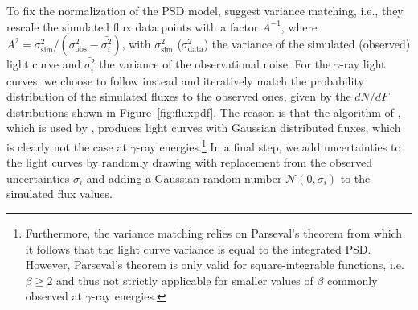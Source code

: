 \documentclass[twocolumn,linenumbers]{aastex62}
\newcommand{\gray}{$\gamma$-ray\xspace}
\begin{document}
To fix the normalization of the PSD model, \citet{2014MNRAS.445..437M} suggest variance matching, i.e., they rescale the simulated flux data points with a factor $A^{-1}$, where $A^2 = \sigma_\mathrm{sim}^2 / (\sigma_\mathrm{obs}^2 - \bar{\sigma_i^2})$, with $\sigma_\mathrm{sim}^2$ ($\sigma_\mathrm{data}^2$) the variance of the simulated (observed) light curve and $\bar{\sigma_i^2}$ the variance of the observational noise.
For the \gray light curves, we choose to follow \citet{2013MNRAS.433..907E} instead and iteratively match the probability distribution of the simulated fluxes to the observed ones, given by the $dN/dF$ distributions shown in Figure~\ref{fig:fluxpdf}. 
The reason is that the algorithm of \citet{1995A&A...300..707T}, which is used by \citet{2014MNRAS.445..437M}, produces light curves with Gaussian distributed fluxes, which is clearly not the case at \gray energies.\footnote{Furthermore, the variance matching relies on Parseval's theorem from which it follows that the light curve variance is equal to the integrated PSD. However, Parseval's theorem is only valid for square-integrable functions, i.e. $\beta \geqslant 2$ and thus not strictly applicable for smaller values of $\beta$ commonly observed at \gray energies.}
In a final step, we add uncertainties to the light curves by randomly drawing with replacement from the observed uncertainties $\sigma_i$ and adding a Gaussian random number $\mathcal{N}(0,\sigma_i)$ to the simulated flux values.
\end{document}
